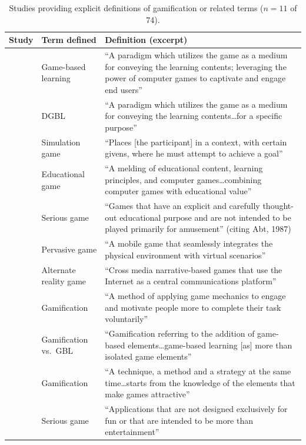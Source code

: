 \documentclass[a4paper,fleqn]{cas-sc}
\begin{document}
\setlength \tabcolsep {0.25\tabcolsep }

\begin{table}
\caption{Studies providing explicit definitions of gamification or related terms ($n=11$ of 74).}
\label{tab:explicit_definitions}

		\begin{tabularx}{\linewidth}{@{}|l|l|X|}
\hline
\hfill \textbf{Study} & \hfill \textbf{Term defined} & \hfil \textbf{Definition (excerpt)} \\ \hline
\citet{30Zin2008} & Game-based learning & ``A paradigm which utilizes the game as a medium for conveying the learning contents; leveraging the power of computer games to captivate and engage end users'' \\ \hline
\citet{23Zin2009322} & DGBL & ``A paradigm which utilizes the game as a medium for conveying the learning contents\ldots for a specific purpose'' \\ \hline
\citet{76Corbeil2011462} & Simulation game & ``Places [the participant] in a context, with certain givens, where he must attempt to achieve a goal'' \\ \hline
\citet{65Razak201139} & Educational game & ``A melding of educational content, learning principles, and computer games\ldots combining computer games with educational value'' \\ \hline
\citet{42Huffer201581} & Serious game & ``Games that have an explicit and carefully thought-out educational purpose and are not intended to be played primarily for amusement'' (citing Abt, 1987) \\ \hline
\citet{58Shih2015173} & Pervasive game & ``A mobile game that seamlessly integrates the physical environment with virtual scenarios'' \\ \hline
\citet{71lynch2015pedagogical} & Alternate reality game & ``Cross media narrative-based games that use the Internet as a central communications platform'' \\ \hline
\citet{43ali2018indonesian} & Gamification & ``A method of applying game mechanics to engage and motivate people more to complete their task voluntarily'' \\ \hline
\citet{36Scholz2021} & Gamification vs.\ GBL & ``Gamification referring to the addition of game-based elements\ldots game-based learning [as] more than isolated game elements'' \\ \hline
\citet{34Serrano2023} & Gamification & ``A technique, a method and a strategy at the same time\ldots starts from the knowledge of the elements that make games attractive'' \\ \hline
\citet{41Petersen2023301} & Serious game & ``Applications that are not designed exclusively for fun or that are intended to be more than entertainment'' \\ \hline
\end{tabularx}
\end{table}
\end{document}
